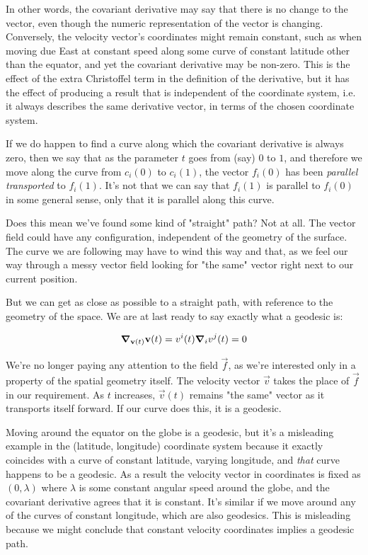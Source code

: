 In other words, the covariant derivative may say that there is no change to the vector, even though the numeric representation of the vector is changing. Conversely, the velocity vector's coordinates might remain constant, such as when moving due East at constant speed along some curve of constant latitude other than the equator, and yet the covariant derivative may be non-zero. This is the effect of the extra Christoffel term in the definition of the derivative, but it has the effect of producing a result that is independent of the coordinate system, i.e. it always describes the same derivative vector, in terms of the chosen coordinate system.

If we do happen to find a curve along which the covariant derivative is always zero, then we say that as the parameter $t$ goes from (say) $0$ to $1$, and therefore we move along the curve from $c_i(0)$ to $c_i(1)$, the vector $f_i(0)$ has been \textit{parallel transported} to $f_i(1)$. It's not that we can say that $f_i(1)$ is parallel to $f_i(0)$ in some general sense, only that it is parallel along this curve.

Does this mean we've found some kind of "straight" path? Not at all. The vector field could have any configuration, independent of the geometry of the surface. The curve we are following may have to wind this way and that, as we feel our way through a messy vector field looking for "the same" vector right next to our current position.

But we can get as close as possible to a straight path, with reference to the geometry of the space. We are at last ready to say exactly what a geodesic is:

$$
\grad_{\mathbf{v}(t)} \mathbf{v}(t)
=
v^i(t) \grad_i v^j(t) = 0
$$

We're no longer paying any attention to the field $\vec{f}$, as we're interested only in a property of the spatial geometry itself. The velocity vector $\vec{v}$ takes the place of $\vec{f}$ in our requirement. As $t$ increases, $\vec{v}(t)$ remains "the same" vector as it transports itself forward. If our curve does this, it is a geodesic.

Moving around the equator on the globe is a geodesic, but it's a misleading example in the (latitude, longitude) coordinate system because it exactly coincides with a curve of constant latitude, varying longitude, and \textit{that} curve happens to be a geodesic. As a result the velocity vector in coordinates is fixed as $(0, \lambda)$ where $\lambda$ is some constant angular speed around the globe, and the covariant derivative agrees that it is constant. It's similar if we move around any of the curves of constant longitude, which are also geodesics. This is misleading because we might conclude that constant velocity coordinates implies a geodesic path.


